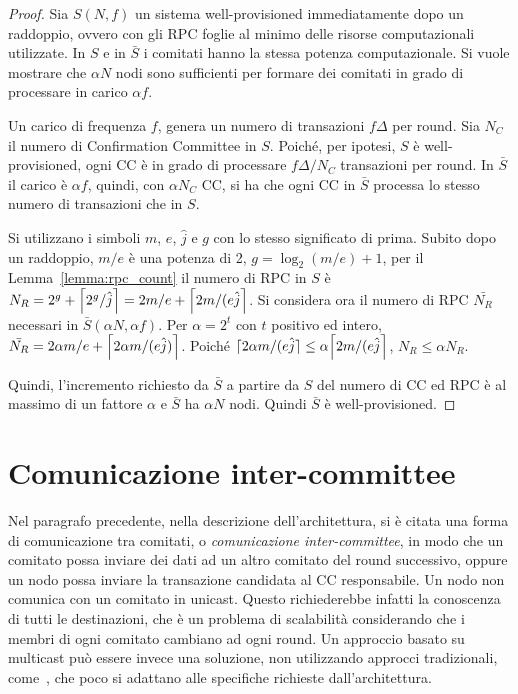 \begin{proof}
Sia $S(N, f)$ un sistema well-provisioned immediatamente dopo un raddoppio, ovvero con gli RPC foglie al minimo delle risorse computazionali utilizzate. In $S$ e in $\bar{S}$ i comitati hanno la stessa potenza computazionale. Si vuole mostrare che $\alpha N$ nodi sono sufficienti per formare dei comitati in grado di processare in carico $\alpha f$.

Un carico di frequenza $f$, genera un numero di transazioni $f \Delta$ per round. Sia $N_C$ il numero di Confirmation Committee in $S$. Poiché, per ipotesi, $S$ è well-provisioned, ogni CC è in grado di processare $f \Delta / N_C$ transazioni per round. In $\bar{S}$ il carico è $\alpha f$, quindi, con $\alpha N_C$ CC, si ha che ogni CC in $\bar{S}$ processa lo stesso numero di transazioni che in $S$.

Si utilizzano i simboli $m$, $e$, $\hat{j}$ e $g$ con lo stesso significato di prima.
Subito dopo un raddoppio, $m/e$ è una potenza di 2, $g= \log_2 (m/e) +1$, per il Lemma~\ref{lemma:rpc_count} il numero di RPC in $S$ è $N_R = 2^g + \ceil*{2^g/\hat{j}} = 2m/e + \ceil*{2 m/ (e \hat{j}}$. Si considera ora il numero di RPC $\bar{N_R}$ necessari in $\bar{S}(\alpha N, \alpha f)$. Per $\alpha = 2^t$ con $t$ positivo ed intero, $\bar{N_R} = 2 \alpha m / e + \ceil*{2 \alpha m / (e \hat{j})}$. Poiché $\ceil{2 \alpha m/(e \hat{j}} \leq \alpha \ceil*{2 m / (e \hat{j}}$, $N_R \leq \alpha N_R$.

Quindi, l'incremento richiesto da $\bar{S}$ a partire da $S$ del numero di CC ed RPC è al massimo di un fattore $\alpha$ e $\bar{S}$ ha $\alpha N$ nodi. Quindi $\bar{S}$ è well-provisioned.
\end{proof}


\section{Comunicazione inter-committee}

Nel paragrafo precedente, nella descrizione dell'architettura, si è citata una forma di comunicazione tra comitati, o \emph{comunicazione inter-committee}, in modo che un comitato possa inviare dei dati ad un altro comitato del round successivo, oppure un nodo possa inviare la transazione candidata al CC responsabile.
Un nodo non comunica con un comitato in unicast. Questo richiederebbe infatti la conoscenza di tutti le destinazioni, che è un problema di scalabilità considerando che i membri di ogni comitato cambiano ad ogni round. Un approccio basato su multicast può essere invece una soluzione, non utilizzando approcci tradizionali, come~, che poco si adattano alle specifiche richieste dall'architettura.

